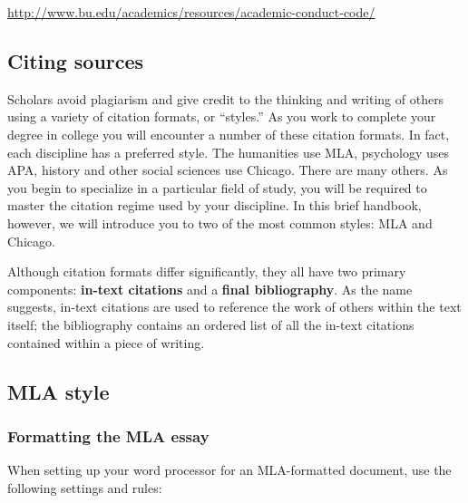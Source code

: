 \documentclass[12pt, hidelinks]{article} %
\newcommand{\tab}{\hspace*{2em}}
\begin{document}
\tab \url{http://www.bu.edu/academics/resources/academic-conduct-code/}



\subsection{Citing sources}

Scholars avoid plagiarism and give credit to the thinking and writing of others using a variety of citation formats, or ``styles.'' As you work to complete your degree in college you will encounter a number of these citation formats. In fact, each discipline has a preferred style. The humanities use MLA, psychology uses APA, history and other social sciences use Chicago. There are many others. As you begin to specialize in a particular field of study, you will be required to master the citation regime used by your discipline. In this brief handbook, however, we will introduce you to two of the most common styles: MLA and Chicago.

Although citation formats differ significantly, they all have two primary components: \textbf{in-text citations} and a \textbf{final bibliography}. As the name suggests, in-text citations are used to reference the work of others within the text itself; the bibliography contains an ordered list of all the in-text citations contained within a piece of writing.



\subsection{MLA style} %


\subsubsection{Formatting the MLA essay}
When setting up your word processor for an MLA-formatted document, use the following settings and rules:
\end{document}
